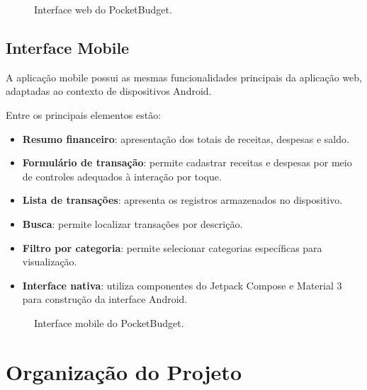 \documentclass[12pt,a4paper]{article}
\begin{document}
\begin{figure}[H]
    \centering
    \caption{Interface web do PocketBudget.}
    \label{fig:web-interface}
\end{figure}

\subsection{Interface Mobile}

A aplicação mobile possui as mesmas funcionalidades principais da aplicação web, adaptadas ao contexto de dispositivos Android.

Entre os principais elementos estão:

\begin{itemize}
    \item \textbf{Resumo financeiro}: apresentação dos totais de receitas, despesas e saldo.
    
    \item \textbf{Formulário de transação}: permite cadastrar receitas e despesas por meio de controles adequados à interação por toque.
    
    \item \textbf{Lista de transações}: apresenta os registros armazenados no dispositivo.
    
    \item \textbf{Busca}: permite localizar transações por descrição.
    
    \item \textbf{Filtro por categoria}: permite selecionar categorias específicas para visualização.
    
    \item \textbf{Interface nativa}: utiliza componentes do Jetpack Compose e Material 3 para construção da interface Android.
\end{itemize}

\begin{figure}[H]
    \centering
    \caption{Interface mobile do PocketBudget.}
    \label{fig:mobile-interface}
\end{figure}

\section{Organização do Projeto}
\end{document}
